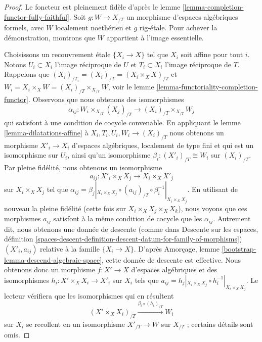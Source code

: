 \begin{proof}
Le foncteur est pleinement fidèle d'après le
lemme \ref{lemma-completion-functor-fully-faithful}.
Soit $g : W \to X_{/T}$ un morphisme d'espaces algébriques formels,
avec $W$ localement noethérien et $g$ rig-étale.
Pour achever la démonstration, montrons que $W$ appartient à l'image essentielle.

\medskip\noindent
Choisissons un recouvrement étale $\{X_i \to X\}$ tel que $X_i$ soit affine
pour tout $i$. Notons $U_i \subset X_i$ l'image réciproque de $U$ et
$T_i \subset X_i$ l'image réciproque de $T$.
Rappelons que $(X_i)_{/T_i} = (X_i)_{/T} = (X_i \times_X X)_{/T}$ et
$W_i = X_i \times_X W = (X_i)_{/T} \times_{X_{/T}} W$, voir
le lemme \ref{lemma-functoriality-completion-functor}.
Observons que nous obtenons des isomorphismes
$$
\alpha_{ij} :
W_i \times_{X_{/T}} (X_j)_{/T}
\longrightarrow 
(X_i)_{/T} \times_{X_{/T}} W_j
$$
qui satisfont à une condition de cocycle convenable.
En appliquant le lemme \ref{lemma-dilatations-affine} à
$X_i, T_i, U_i, W_i \to (X_i)_{/T}$
nous obtenons un morphisme $X'_i \to X_i$ d'espaces algébriques,
localement de type fini et qui est un isomorphisme sur $U_i$,
ainsi qu'un isomorphisme $\beta_i : (X'_i)_{/T} \cong W_i$ sur $(X_i)_{/T}$.
Par pleine fidélité, nous obtenons un isomorphisme
$$
a_{ij} : X'_i \times_X X_j \longrightarrow X_i \times_X X'_j
$$
sur $X_i \times_X X_j$ tel que
$\alpha_{ij} = \beta_j|_{X_i \times_X X_j}
\circ (a_{ij})_{/T} \circ \beta_i^{-1}|_{X_i \times_X X_j}$.
En utilisant de nouveau la pleine fidélité (cette fois sur
$X_i \times_X X_j \times_X X_k$),
nous voyons que ces morphismes $a_{ij}$ satisfont à la même
condition de cocycle que les $\alpha_{ij}$.
Autrement dit, nous obtenons une donnée de descente
(comme dans Descente sur les espaces, définition
\ref{spaces-descent-definition-descent-datum-for-family-of-morphisms})
$(X'_i, a_{ij})$ relative à la famille $\{X_i \to X\}$.
D'après Amorçage, lemme \ref{bootstrap-lemma-descend-algebraic-space},
cette donnée de descente est effective. Nous obtenons donc un morphisme
$f : X' \to X$ d'espaces algébriques et des isomorphismes
$h_i : X' \times_X X_i \to X'_i$ sur $X_i$ tels que
$a_{ij} = h_j|_{X_i \times_X X_j} \circ h_i^{-1}|_{X_i \times_X X_j}$.
Le lecteur vérifiera que les isomorphismes qui en résultent
$$
(X' \times_X X_i)_{/T}
\xrightarrow{\beta_i \circ (h_i)_{/T}}
W_i
$$
sur $X_i$ se recollent en un isomorphisme $X'_{/T} \to W$
sur $X_{/T}$ ; certains détails sont omis.
\end{proof}










